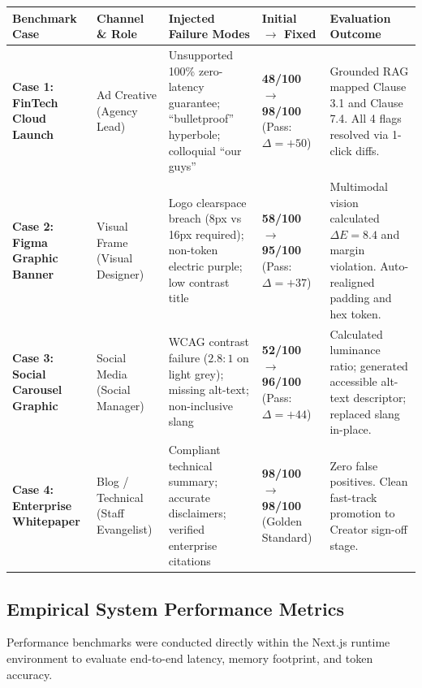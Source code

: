 \documentclass[10pt,a4paper]{article}
\begin{document}
\begin{center}
\footnotesize
\begin{tabularx}{\textwidth}{p{2.8cm}p{2.0cm}p{3.8cm}p{2.2cm}X}
\toprule
\textbf{Benchmark Case} & \textbf{Channel \& Role} & \textbf{Injected Failure Modes} & \textbf{Initial $\rightarrow$ Fixed} & \textbf{Evaluation Outcome} \\
\midrule
\textbf{Case 1: FinTech Cloud Launch} & Ad Creative \newline (Agency Lead) & Unsupported 100\% zero-latency guarantee; ``bulletproof'' hyperbole; colloquial ``our guys'' & \textbf{48/100} $\rightarrow$ \textbf{98/100} \newline (Pass: $\Delta = +50$) & Grounded RAG mapped Clause 3.1 and Clause 7.4. All 4 flags resolved via 1-click diffs. \\
\addlinespace[0.1cm]
\textbf{Case 2: Figma Graphic Banner} & Visual Frame \newline (Visual Designer) & Logo clearspace breach (8px vs 16px required); non-token electric purple; low contrast title & \textbf{58/100} $\rightarrow$ \textbf{95/100} \newline (Pass: $\Delta = +37$) & Multimodal vision calculated $\Delta E = 8.4$ and margin violation. Auto-realigned padding and hex token. \\
\addlinespace[0.1cm]
\textbf{Case 3: Social Carousel Graphic} & Social Media \newline (Social Manager) & WCAG contrast failure ($2.8:1$ on light grey); missing alt-text; non-inclusive slang & \textbf{52/100} $\rightarrow$ \textbf{96/100} \newline (Pass: $\Delta = +44$) & Calculated luminance ratio; generated accessible alt-text descriptor; replaced slang in-place. \\
\addlinespace[0.1cm]
\textbf{Case 4: Enterprise Whitepaper} & Blog / Technical \newline (Staff Evangelist) & Compliant technical summary; accurate disclaimers; verified enterprise citations & \textbf{98/100} $\rightarrow$ \textbf{98/100} \newline (Golden Standard) & Zero false positives. Clean fast-track promotion to Creator sign-off stage. \\
\bottomrule
\end{tabularx}
\end{center}

\vspace{-0.2cm}
\subsection{Empirical System Performance Metrics}
Performance benchmarks were conducted directly within the Next.js runtime environment to evaluate end-to-end latency, memory footprint, and token accuracy.
\end{document}
